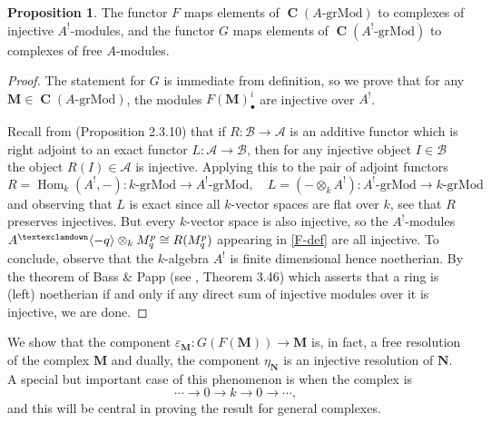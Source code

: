 \documentclass[a4paper]{article}
\theoremstyle{definition}
\newtheorem{prop}[defn]{Proposition}
\theoremstyle{remark}
\newcommand{\grMod}{\ensuremath{\text{-grMod}}}
\DeclareMathOperator{\Hom}{\text{Hom}}
\DeclareMathOperator{\Ch}{\mathbf{C}}
\newcommand{\gnab}{{\textexclamdown}}
\begin{document}
\begin{prop} \label{prop-F-2}
    The functor \(F\) maps elements of \(\Ch(A\grMod)\) to complexes of
    injective \(A^!\)-modules, and the functor \(G\) maps elements of
    \(\Ch(A^!\grMod)\) to complexes of free \(A\)-modules.
    \begin{proof}
        The statement for \(G\) is immediate from definition, so we prove that
        for any \(\mathbf{M}\in \Ch(A\grMod)\), the modules
        \(F(\mathbf{M})^i_\bullet\) are injective over \(A^!\).

        Recall from  (Proposition 2.3.10)
        that if \(R: \mathcal{B}\rightarrow\mathcal{A}\) is an additive functor
        which is right adjoint to an exact functor
        \(L:\mathcal{A}\rightarrow\mathcal{B}\), then for any injective object
        \(I\in \mathcal{B}\) the object \(R(I)\in \mathcal{A}\) is injective.
        Applying this to the pair of adjoint functors 
        \[R= \Hom_k(A^!, -): k\grMod \rightarrow A^!\grMod , \quad L =
        (-\otimes_k A^!): A^!\grMod \rightarrow k\grMod\] 
        and observing that \(L\) is exact since all \(k\)-vector spaces are flat
        over \(k\), see that \(R\) preserves injectives. But every \(k\)-vector
        space is also injective, so the \(A^!\)-modules \(A^\gnab\langle -q
        \rangle \otimes_k M^p_q \cong R(M^p_q)\) appearing in \eqref{F-def} are
        all injective. To conclude, observe that the \(k\)-algebra \(A^!\) is finite
        dimensional hence noetherian. By the theorem of Bass \& Papp (see
        , Theorem 3.46) which asserts that a ring
        is (left) noetherian if and only if any direct sum of injective
        modules over it is injective, we are done.
    \end{proof}
\end{prop}

We show that the component \(\varepsilon_\mathbf{M}:G(F(\mathbf{M}))\rightarrow
\mathbf{M}\) is, in fact, a free resolution of the complex \(\mathbf{M}\) and
dually, the component \(\eta_\mathbf{N}\) is an injective resolution of
\(\mathbf{N}\). A special but important case of this phenomenon is when the
complex is \[\cdots \rightarrow 0\longrightarrow k\longrightarrow 0\rightarrow
\cdots,\] and this will be central in proving the result for general complexes.
\end{document}
